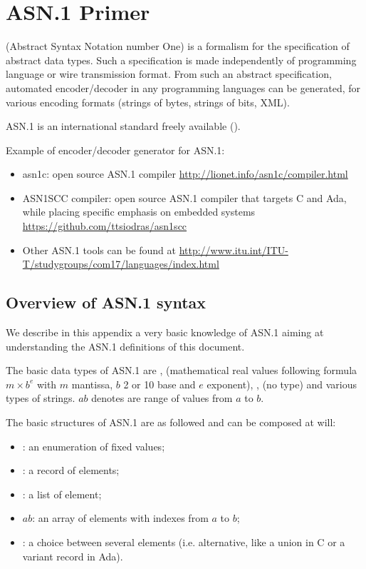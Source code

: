\chapter{ASN.1 Primer}
\label{asn1-primer}

 (Abstract Syntax Notation number One) is a formalism
for the specification of abstract data types. Such a specification is
made independently of programming language or wire transmission
format. From such an abstract specification, automated encoder/decoder
in any programming languages can be generated, for various encoding
formats (strings of bytes, strings of bits, XML).

ASN.1 is an international standard freely available
(\cite{asn1-standard}).

Example of encoder/decoder generator for ASN.1:
\begin{itemize}
\item asn1c: open source ASN.1 compiler
  \url{http://lionet.info/asn1c/compiler.html}
\item ASN1SCC compiler: open source ASN.1 compiler that targets C and
  Ada, while placing specific emphasis on embedded systems
  \url{https://github.com/ttsiodras/asn1scc}
\item Other ASN.1 tools can be found at
  \url{http://www.itu.int/ITU-T/studygroups/com17/languages/index.html}
\end{itemize}

\section{Overview of ASN.1 syntax}

We describe in this appendix a very basic knowledge of ASN.1 aiming at
understanding the ASN.1 definitions of this document.

The basic data types of ASN.1 are , 
(mathematical real values following formula $m \times b^e$ with $m$
mantissa, $b$ 2 or 10 base and $e$ exponent), ,
 (no type) and various types of strings. $a$$b$
denotes are range of values from $a$ to $b$.

The basic structures of ASN.1 are as followed and can be composed at
will:
\begin{itemize}
\item {}: an
  enumeration of fixed values;
\item {}: a record of
  elements;
\item {}: a list
  of element;
\item {}$a$$b$: an array of elements with indexes
  from $a$ to $b$;
\item {}: a choice between
  several elements (i.e. alternative, like a union in C or a variant
  record in Ada).
\end{itemize}

